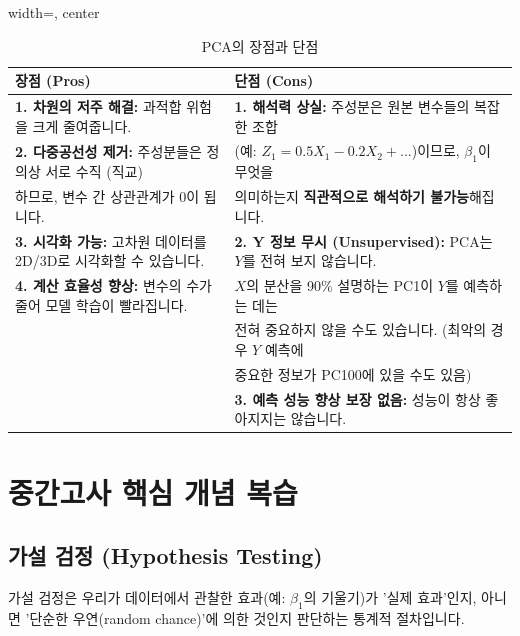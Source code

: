 \documentclass[11pt,a4paper]{book}
\theoremstyle{definition}
\begin{document}
\begin{table}[h!]
\begin{adjustbox}{width=\textwidth, center}
\begin{tabular}{ll}
\toprule
\textbf{장점 (Pros)} & \textbf{단점 (Cons)} \\
\midrule
\textbf{1. 차원의 저주 해결:} 과적합 위험을 크게 줄여줍니다. & \textbf{1. 해석력 상실:} 주성분은 원본 변수들의 복잡한 조합 \\
\textbf{2. 다중공선성 제거:} 주성분들은 정의상 서로 수직 (직교) & (예: $Z_1 = 0.5X_1 - 0.2X_2 + ...$)이므로, $\beta_1$이 무엇을 \\
하므로, 변수 간 상관관계가 0이 됩니다. & 의미하는지 \textbf{직관적으로 해석하기 불가능}해집니다. \\
\textbf{3. 시각화 가능:} 고차원 데이터를 2D/3D로 시각화할 수 있습니다. & \textbf{2. Y 정보 무시 (Unsupervised):} PCA는 $Y$를 전혀 보지 않습니다. \\
\textbf{4. 계산 효율성 향상:} 변수의 수가 줄어 모델 학습이 빨라집니다. & $X$의 분산을 90\% 설명하는 PC1이 $Y$를 예측하는 데는 \\
 & 전혀 중요하지 않을 수도 있습니다. (최악의 경우 $Y$ 예측에 \\
 & 중요한 정보가 PC100에 있을 수도 있음) \\
 & \textbf{3. 예측 성능 향상 보장 없음:} 성능이 항상 좋아지지는 않습니다. \\
\bottomrule
\end{tabular}
\end{adjustbox}
\caption{PCA의 장점과 단점}
\label{tab:pca_pros_cons}
\end{table}


\section{중간고사 핵심 개념 복습}

\subsection{가설 검정 (Hypothesis Testing)}
가설 검정은 우리가 데이터에서 관찰한 효과(예: $\beta_1$의 기울기)가 '실제 효과'인지, 아니면 '단순한 우연(random chance)'에 의한 것인지 판단하는 통계적 절차입니다.
\end{document}
